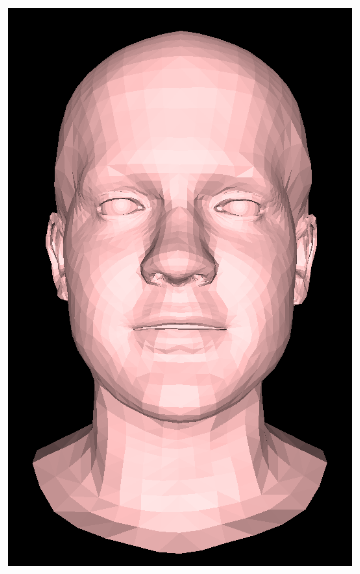 \begin{figure}[h!]
\begin{subfigure}[b]{0.19\textwidth}
        \includegraphics[width=\textwidth]{figures/gen_sample/00017.png}
    \end{subfigure}
    \begin{subfigure}[b]{0.19\textwidth}

\end{subfigure}
\end{figure}
